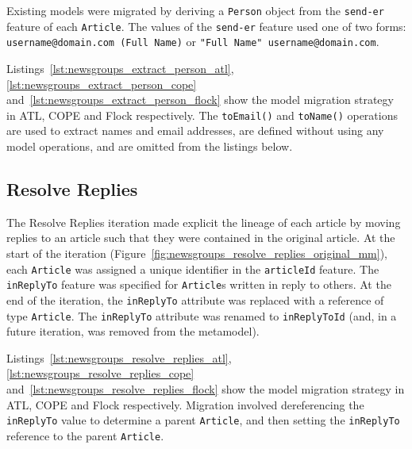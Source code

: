 
Existing models were migrated by deriving a \texttt{Pe\-rs\-on} object from the \texttt{se\-nd-\-er} feature of each \texttt{Ar\-ti\-c\-le}. The values of the \texttt{se\-nd-\-er} feature used one of two forms: \texttt{username@domain.com (Full Name)} or \texttt{"Full Name" username@domain.com}.

Listings~\ref{lst:newsgroups_extract_person_atl}, \ref{lst:newsgroups_extract_person_cope} and~\ref{lst:newsgroups_extract_person_flock} show the model migration strategy in ATL, COPE and Flock respectively. The \texttt{toEmail()} and \texttt{toName()} operations are used to extract names and email addresses, are defined without using any model operations, and are omitted from the listings below.


\subsection{Resolve Replies}
The Resolve Replies iteration made explicit the lineage of each article by moving replies to an article such that they were contained in the original article. At the start of the iteration (Figure~\ref{fig:newsgroups_resolve_replies_original_mm}), each \texttt{Article} was assigned a unique identifier in the \texttt{articleId} feature. The \texttt{inReplyTo} feature was specified for \texttt{Article}s written in reply to others. At the end of the iteration, the \texttt{inReplyTo} attribute was replaced with a reference of type \texttt{Article}. The \texttt{inReplyTo} attribute was renamed to \texttt{inReplyToId} (and, in a future iteration, was removed from the metamodel).


Listings~\ref{lst:newsgroups_resolve_replies_atl}, \ref{lst:newsgroups_resolve_replies_cope} and~\ref{lst:newsgroups_resolve_replies_flock} show the model migration strategy in ATL, COPE and Flock respectively. Migration involved dereferencing the \texttt{inReplyTo} value to determine a parent \texttt{Article}, and then setting the \texttt{inReplyTo} reference to the parent \texttt{Article}.



